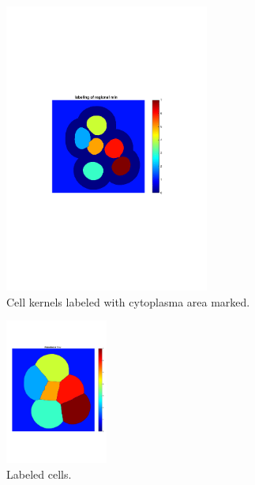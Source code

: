 \documentclass[10pt,twocolumn]{article}
\begin{document}
\begin{figure}[ht]
\centering
\includegraphics[width=0.6\textwidth]{Bilder/CellBwLabeldKernels.pdf}
\caption{Cell kernels labeled with cytoplasma area marked.}
\label{fig:CellCyto}
\end{figure}

\begin{figure}[ht]
\centering
\includegraphics[width=0.3\textwidth]{Bilder/CellBwLabeld.pdf}
\caption{Labeled cells.}
\label{fig:CellLabeled}
\end{figure}
\end{document}

